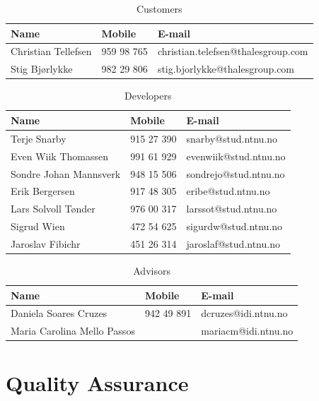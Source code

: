\begin{table}[!ht] \footnotesize \center
\caption{Customers\label{tab:part_cust}}
\begin{tabular}{l l l}
	\toprule
	Name & Mobile & E-mail \\ 
	\midrule
	Christian Tellefsen & 959 98 765 & christian.telefsen@thalesgroup.com \\ 
	Stig Bjørlykke & 982 29 806 & stig.bjorlykke@thalesgroup.com \\ 
	\bottomrule
\end{tabular}
\end{table}

\begin{table}[!ht] \footnotesize \center
\caption{Developers\label{tab:part_dev}}
\begin{tabular}{l l l}
	\toprule
	Name & Mobile & E-mail  \\ 
	\midrule
	Terje Snarby & 915 27 390 & snarby@stud.ntnu.no \\ 
	Even Wiik Thomassen & 991 61 929 & evenwiik@stud.ntnu.no \\ 
	Sondre Johan Mannsverk & 948 15 506 & sondrejo@stud.ntnu.no \\ 
	Erik Bergersen & 917 48 305 & eribe@stud.ntnu.no \\ 
	Lars Solvoll Tønder & 976 00 317 & larssot@stud.ntnu.no \\ 
	Sigrud Wien & 472 54 625 & sigurdw@stud.ntnu.no \\ 
	Jaroslav Fibichr & 451 26 314 & jaroslaf@stud.ntnu.no \\ 
	\bottomrule
\end{tabular}
\end{table}

\begin{table}[!ht] \footnotesize \center
\caption{Advisors\label{tab:part_adv}}
\begin{tabular}{l l l}
	\toprule
	Name & Mobile & E-mail  \\ 
	\midrule
	Daniela Soares Cruzes & 942 49 891 & dcruzes@idi.ntnu.no \\ 
	Maria Carolina Mello Passos & & mariacm@idi.ntnu.no \\ 
	\bottomrule
\end{tabular}
\end{table}

\section{Quality Assurance}

